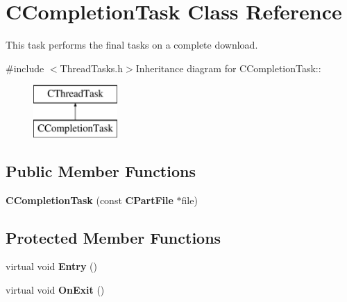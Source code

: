 \section{CCompletionTask Class Reference}
\label{classCCompletionTask}


This task performs the final tasks on a complete download.  


{\ttfamily \#include $<$ThreadTasks.h$>$}Inheritance diagram for CCompletionTask::\begin{figure}[H]
\begin{center}
\leavevmode
\includegraphics[height=2cm]{classCCompletionTask}
\end{center}
\end{figure}
\subsection*{Public Member Functions}
\begin{DoxyCompactItemize}
\item 
{\bf CCompletionTask} (const {\bf CPartFile} $\ast$file)\label{classCCompletionTask_a392abc126f12fdc8a7f20b0cfeb15833}

\end{DoxyCompactItemize}
\subsection*{Protected Member Functions}
\begin{DoxyCompactItemize}
\item 
virtual void {\bf Entry} ()\label{classCCompletionTask_ac8fec26d8a1ee7ee5e9e97aea56d9c86}

\item 
virtual void {\bf OnExit} ()\label{classCCompletionTask_aed5ffa34885de5ab6df4fba2e3b53e38}

\end{DoxyCompactItemize}
